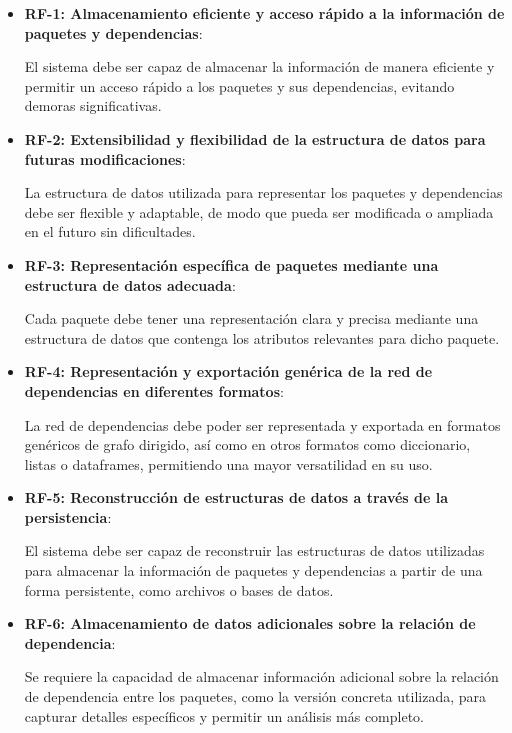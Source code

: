\begin{itemize}
    \item \textbf{RF-1: Almacenamiento eficiente y acceso rápido a la información de paquetes y dependencias}: 
	
	El sistema debe ser capaz de almacenar la información de manera eficiente y permitir un acceso rápido a los paquetes y sus dependencias, evitando demoras significativas.
    
    \item \textbf{RF-2: Extensibilidad y flexibilidad de la estructura de datos para futuras modificaciones}: 
	
	La estructura de datos utilizada para representar los paquetes y dependencias debe ser flexible y adaptable, de modo que pueda ser modificada o ampliada en el futuro sin dificultades.
    
    \item \textbf{RF-3: Representación específica de paquetes mediante una estructura de datos adecuada}: 
	
	Cada paquete debe tener una representación clara y precisa mediante una estructura de datos que contenga los atributos relevantes para dicho paquete.
    
    \item \textbf{RF-4: Representación y exportación genérica de la red de dependencias en diferentes formatos}: 
	
	La red de dependencias debe poder ser representada y exportada en formatos genéricos de grafo dirigido, así como en otros formatos como diccionario, listas o dataframes, permitiendo una mayor versatilidad en su uso.
    
    \item \textbf{RF-5: Reconstrucción de estructuras de datos a través de la persistencia}: 
	
	El sistema debe ser capaz de reconstruir las estructuras de datos utilizadas para almacenar la información de paquetes y dependencias a partir de una forma persistente, como archivos o bases de datos.
    
    \item \textbf{RF-6: Almacenamiento de datos adicionales sobre la relación de dependencia}: 
	
	Se requiere la capacidad de almacenar información adicional sobre la relación de dependencia entre los paquetes, como la versión concreta utilizada, para capturar detalles específicos y permitir un análisis más completo.
    

\end{itemize}
